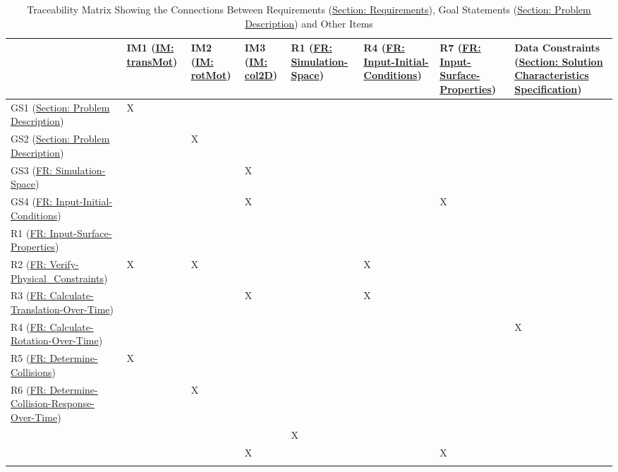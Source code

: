 \documentclass[12pt]{article}
\begin{document}
\begin{longtable}{l l l l l l l l}
\toprule
 & IM1 (\hyperref[IM:transMot]{IM: transMot}) & IM2 (\hyperref[IM:rotMot]{IM: rotMot}) & IM3 (\hyperref[IM:col2D]{IM: col2D}) & R1 (\hyperref[reqSS]{FR: Simulation-Space}) & R4 (\hyperref[reqIIC]{FR: Input-Initial-Conditions}) & R7 (\hyperref[reqISP]{FR: Input-Surface-Properties}) & Data Constraints (\hyperref[Sec:SolCharSpec]{Section: Solution Characteristics Specification})
\\
\midrule
GS1 (\hyperref[Sec:ProbDesc]{Section: Problem Description}) & X &  &  &  &  &  & 
\\
GS2 (\hyperref[Sec:ProbDesc]{Section: Problem Description}) &  & X &  &  &  &  & 
\\
GS3 (\hyperref[reqSS]{FR: Simulation-Space}) &  &  & X &  &  &  & 
\\
GS4 (\hyperref[reqIIC]{FR: Input-Initial-Conditions}) &  &  & X &  &  & X & 
\\
R1 (\hyperref[reqISP]{FR: Input-Surface-Properties}) &  &  &  &  &  &  & 
\\
R2 (\hyperref[reqVPC]{FR: Verify-Physical\_Constraints}) & X & X &  &  & X &  & 
\\
R3 (\hyperref[reqCTOT]{FR: Calculate-Translation-Over-Time}) &  &  & X &  & X &  & 
\\
R4 (\hyperref[reqCROT]{FR: Calculate-Rotation-Over-Time}) &  &  &  &  &  &  & X
\\
R5 (\hyperref[reqDC]{FR: Determine-Collisions}) & X &  &  &  &  &  & 
\\
R6 (\hyperref[reqDCROT]{FR: Determine-Collision-Response-Over-Time}) &  & X &  &  &  &  & 
\\
 &  &  &  & X &  &  & 
\\
 &  &  & X &  &  & X & 
\\
\bottomrule
\caption{Traceability Matrix Showing the Connections Between Requirements (\hyperref[Sec:Requirements]{Section: Requirements}), Goal Statements (\hyperref[Sec:ProbDesc]{Section: Problem Description}) and Other Items}
\label{Table:TraceyReqGoalsOther}
\end{longtable}
\end{document}

